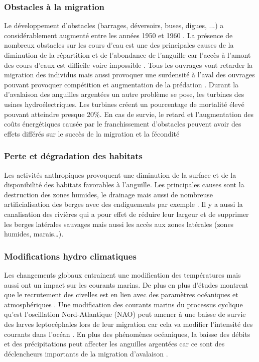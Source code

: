 \documentclass[11pt,titlepage,twoside]{article}\usepackage[]{graphicx}\usepackage[table]{xcolor}
\begin{document}
\subsubsection{Obstacles à la migration}

Le développement d’obstacles (barrages, déversoirs, buses, digues, ...) a considérablement augmenté entre les années 1950 et 1960 \citep{miller_did_2016}. La présence de nombreux obstacles sur les cours d’eau est une des principales causes de la diminution de la répartition et de l’abondance de l’anguille car l’accès à l’amont des cours d’eaux est difficile voire impossible \citep{adam_anguille_2008}. Tous les ouvrages vont retarder la migration des individus mais aussi provoquer une surdensité à l’aval des ouvrages pouvant provoquer compétition et augmentation de la prédation \citep{bevacqua_intra-specific_2011,drouineau_assessing_2014}. Durant la d’avalaison des anguilles argentées un autre problème se pose, les turbines des usines hydroélectriques. Les turbines créent un pourcentage de mortalité élevé pouvant atteindre presque 20\%. En cas de survie, le retard et l'augmentation des coûts énergétiques causée par le franchissement d'obstacles peuvent avoir des effets différés sur le succès de la migration et la fécondité \citep{van_ginneken_eel_2000}

\subsubsection{Perte et dégradation des habitats}

Les activités anthropiques provoquent une diminution de la surface et de la disponibilité des habitats favorables à l’anguille. Les principales causes sont la destruction des zones humides, le drainage mais aussi de nombreuse artificialisation des berges avec des endiguements par exemple \citep{basset_unifying_2013}. Il y a aussi la canalisation des rivières qui a pour effet de réduire leur largeur et de supprimer les berges latérales sauvages mais aussi les accès aux zones latérales (zones humides, marais…).

\subsubsection{Modifications hydro climatiques}

Les changements globaux entrainent une modification des températures mais aussi ont un impact sur les courants marins. De plus en plus d’études montrent que le recrutement des civelles est en lien avec des paramètres océaniques et atmosphériques \citep{bonhommeau_impact_2008, durif_influence_2010}. Une modification des courants marins du processus cyclique qu’est l’oscillation Nord-Atlantique (NAO) peut amener à une baisse de survie des larves leptocéphales lors de leur migration car cela va modifier l’intensité des courants dans l’océan \citep{durif_influence_2010}. En plus des phénomènes océaniques, la baisse des débits et des précipitations peut affecter les anguilles argentées car ce sont des déclencheurs importants de la migration d’avalaison \citep{bruijs_silver_2009}.
\end{document}
